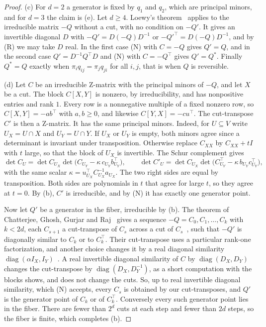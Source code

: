 \begin{proof}
(c) For $d=2$ a generator is fixed by $q_1$ and $q_2$, which are principal
minors, and for $d=3$ the claim is (e). Let $d\ge4$. Loewy's
theorem~\cite[Theorem~1]{loewy1986} applies to the irreducible matrix $-Q$
without a cut, with no condition on $-Q'$. It gives an invertible diagonal
$D$ with $-Q'=D(-Q)D^{-1}$ or $-Q'^\top=D(-Q)D^{-1}$, and by (R) we may take $D$
real. In the
first case (N) with $C=-Q$ gives $Q'=Q$, and in the second case
$Q'=D^{-1}Q^\top D$ and (N) with $C=-Q^\top$ gives $Q'=Q^*$. Finally $Q^*=Q$
exactly when $\pi_iq_{ij}=\pi_jq_{ji}$ for all $i,j$, that is when $Q$ is
reversible.

(d) Let $C$ be an irreducible Z-matrix with the principal minors of $-Q$, and
let $X$ be a cut. The block $C[X,Y]$ is nonzero, by irreducibility, and has
nonpositive entries and rank $1$. Every row is a nonnegative multiple of a fixed
nonzero row, so $C[X,Y]=-ab^\top$ with $a,b\ge0$, and likewise
$C[Y,X]=-cu^\top$. The cut-transpose $C'$ is then a Z-matrix. It has the same
principal minors. Indeed, for $U\subseteq V$ write $U_X=U\cap X$ and $U_Y=U\cap
Y$. If $U_X$ or $U_Y$ is empty, both minors agree since a determinant is
invariant under transposition. Otherwise replace $C_{XX}$ by $C_{XX}+tI$ with
$t$ large, so that the block of $U_X$ is invertible. The Schur complement gives
\[
 \det C_U=\det C_{U_X}\det\bigl(C_{U_Y}-\kappa\,c_{U_Y}b_{U_Y}^\top\bigr),\qquad
 \det C'_U=\det C_{U_X}\det\bigl(C_{U_Y}^\top-\kappa\,b_{U_Y}c_{U_Y}^\top\bigr),
\]
with the same scalar $\kappa=u_{U_X}^\top C_{U_X}^{-1}a_{U_X}$. The two right sides
are equal by transposition. Both sides are polynomials in $t$ that agree for
large $t$, so they agree at $t=0$. By (b), $C'$ is irreducible, and by (N) it
has exactly one generator point.

Now let $Q'$ be a generator in the fiber, irreducible by (b). The theorem of
Chatterjee, Ghosh, Gurjar and Raj~\cite[Theorem~1.1]{cggr2024} gives a sequence
$-Q=C_0,C_1,\dots,C_k$ with $k<2d$, each $C_{s+1}$ a cut-transpose of $C_s$
across a cut of $C_s$~\cite[Definition~2.10]{cggr2024}, such that $-Q'$ is
diagonally similar to $C_k$ or to $C_k^\top$. Their cut-transpose uses a
particular rank-one factorization, and another choice changes it by a real
diagonal similarity $\operatorname{diag}(\alpha I_X,I_Y)$~\cite[Remark~2.11]{cggr2024}.
A real invertible diagonal similarity of $C$ by $\operatorname{diag}(D_X,D_Y)$
changes the cut-transpose by $\operatorname{diag}(D_X,D_Y^{-1})$, as a short
computation with the blocks shows, and does not change the cuts. So, up to real
invertible diagonal similarity, which (N) accepts, every $C_s$ is obtained by our
cut-transposes, and $Q'$ is the generator point of $C_k$ or of $C_k^\top$.
Conversely every such generator point lies in the fiber. There are fewer than
$2^d$ cuts at each step and fewer than $2d$ steps, so the fiber is finite, which
completes (b).


\end{proof}
